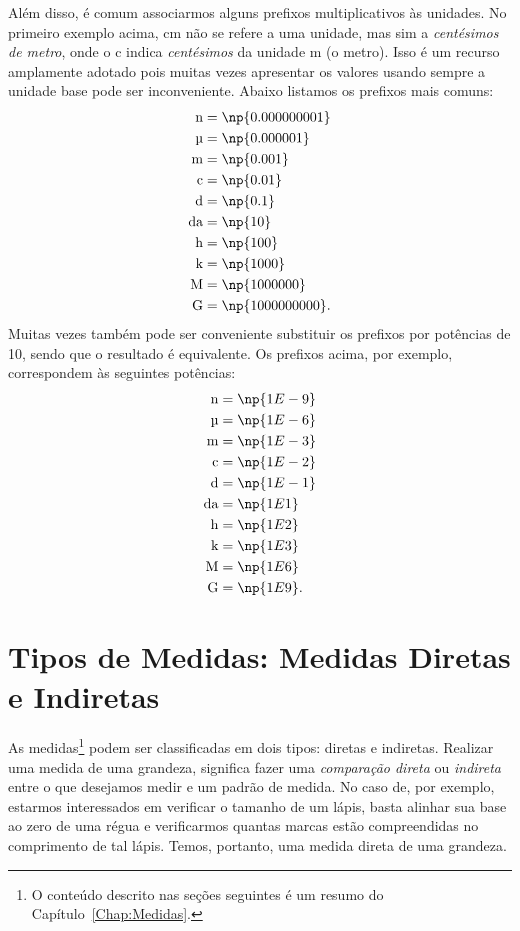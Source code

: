 Além disso, é comum associarmos alguns prefixos multiplicativos às unidades. No primeiro exemplo acima, cm não se refere a uma unidade, mas sim a \emph{centésimos de metro}, onde o c indica \emph{centésimos} da unidade m (o metro). Isso é um recurso amplamente adotado pois muitas vezes apresentar os valores usando sempre a unidade base pode ser inconveniente. Abaixo listamos os prefixos mais comuns:
\begin{align}
    \textrm{n} &= \np{0.000000001} \\
    \textrm{\textmu} &= \np{0.000001} \\
    \textrm{m} &= \np{0.001} \\
    \textrm{c} &= \np{0.01} \\
    \textrm{d} &= \np{0.1} \\
    \textrm{da} &= \np{10} \\
    \textrm{h} &= \np{100} \\
    \textrm{k} &= \np{1000} \\
    \textrm{M} &= \np{1000000} \\
    \textrm{G} &= \np{1000000000}.
\end{align}
%
Muitas vezes também pode ser conveniente substituir os prefixos por potências de 10, sendo que o resultado é equivalente. Os prefixos acima, por exemplo, correspondem às seguintes potências:
\begin{align}
    \textrm{n} &= \np{1E-9} \\
    \textrm{\textmu} &= \np{1E-6} \\
    \textrm{m} &= \np{1E-3} \\
    \textrm{c} &= \np{1E-2} \\
    \textrm{d} &= \np{1E-1} \\
    \textrm{da} &= \np{1E1} \\
    \textrm{h} &= \np{1E2} \\
    \textrm{k} &= \np{1E3} \\
    \textrm{M} &= \np{1E6} \\
    \textrm{G} &= \np{1E9}.
\end{align}  

\section{Tipos de Medidas: Medidas Diretas e Indiretas}

As medidas\footnote{O conteúdo descrito nas seções seguintes é um resumo do Capítulo~\ref{Chap:Medidas}.} podem ser classificadas em dois tipos: diretas e indiretas. Realizar uma medida de uma grandeza, significa fazer uma \emph{comparação direta} ou \emph{indireta} entre o que desejamos medir e um padrão de medida. No caso de, por exemplo, estarmos interessados em verificar o tamanho de um lápis, basta alinhar sua base ao zero de uma régua e verificarmos quantas marcas estão compreendidas no comprimento de tal lápis. Temos, portanto, uma medida direta de uma grandeza.

